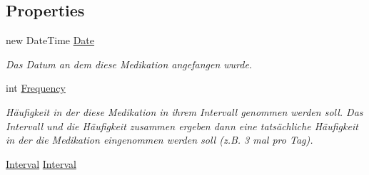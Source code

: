 \subsection*{Properties}
\begin{CompactItemize}
\item 
\hypertarget{interfacemy_m_d_1_1_model_interface_1_1_data_model_interface_1_1_i_medication_44749712dbec183e983dcd78a7736c41}{
new Date\-Time \hyperlink{interfacemy_m_d_1_1_model_interface_1_1_data_model_interface_1_1_i_medication_44749712dbec183e983dcd78a7736c41}{Date}}
\label{d2/dce/interfacemy_m_d_1_1_model_interface_1_1_data_model_interface_1_1_i_medication_44749712dbec183e983dcd78a7736c41}

\begin{CompactList}\small\item\em Das Datum an dem diese Medikation angefangen wurde. \item\end{CompactList}\item 
\hypertarget{interfacemy_m_d_1_1_model_interface_1_1_data_model_interface_1_1_i_medication_7cf395303ce3665a9834721d4b748e4b}{
int \hyperlink{interfacemy_m_d_1_1_model_interface_1_1_data_model_interface_1_1_i_medication_7cf395303ce3665a9834721d4b748e4b}{Frequency}}
\label{d2/dce/interfacemy_m_d_1_1_model_interface_1_1_data_model_interface_1_1_i_medication_7cf395303ce3665a9834721d4b748e4b}

\begin{CompactList}\small\item\em H\"{a}ufigkeit in der diese Medikation in ihrem Intervall genommen werden soll. Das Intervall und die H\"{a}ufigkeit zusammen ergeben dann eine tats\"{a}chliche H\"{a}ufigkeit in der die Medikation eingenommen werden soll (z.B. 3 mal pro Tag). \item\end{CompactList}\item 
\hypertarget{interfacemy_m_d_1_1_model_interface_1_1_data_model_interface_1_1_i_medication_d16dd01adf735ed9b87eebff5fc39ce5}{
\hyperlink{namespacemy_m_d_1_1_model_interface_1_1_data_model_interface_d16dd01adf735ed9b87eebff5fc39ce5}{Interval} \hyperlink{interfacemy_m_d_1_1_model_interface_1_1_data_model_interface_1_1_i_medication_d16dd01adf735ed9b87eebff5fc39ce5}{Interval}}
\label{d2/dce/interfacemy_m_d_1_1_model_interface_1_1_data_model_interface_1_1_i_medication_d16dd01adf735ed9b87eebff5fc39ce5}


\end{CompactItemize}
